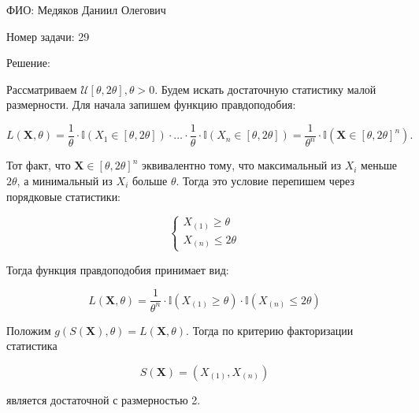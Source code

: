 \documentclass[14pt]{extarticle}
\begin{document}
ФИО: Медяков Даниил Олегович

\vspace{10pt}

Номер задачи: 29

\vspace{10pt}

Решение:

\vspace{10pt}

Рассматриваем $\mathcal{U}[\theta, 2\theta], \theta > 0$. Будем искать достаточную статистику малой размерности. Для начала запишем функцию правдоподобия:

\begin{equation*}
    L(\mathbf{X}, \theta) = \frac{1}{\theta}\cdot\mathbb I (X_1\in [\theta, 2\theta])\cdot\ldots\cdot\frac{1}{\theta}\cdot\mathbb I (X_n\in[\theta, 2\theta]) = \frac{1}{\theta^n}\cdot\mathbb I(\mathbf{X}\in[\theta, 2\theta]^n).
\end{equation*}

Тот факт, что $\mathbf{X}\in[\theta, 2\theta]^n$ эквивалентно тому, что максимальный из $X_i$ меньше $2\theta$, а минимальный из $X_i$ больше $\theta$. Тогда это условие перепишем через порядковые статистики:

\begin{equation*}
\begin{cases}
    X_{(1)} \geqslant \theta\\
    X_{(n)} \leqslant 2\theta
\end{cases}
\end{equation*}

Тогда функция правдоподобия принимает вид:

\begin{equation*}
    L(\mathbf{X}, \theta) = \frac{1}{\theta^n}\cdot \mathbb I(X_{(1)} \geqslant \theta)\cdot \mathbb I(X_{(n)} \leqslant 2\theta)
\end{equation*}

Положим $g(S(\mathbf{X}), \theta) = L(\mathbf{X}, \theta)$. Тогда по критерию факторизации статистика

\begin{equation*}
    S(\mathbf{X}) = \left(X_{(1)}, X_{(n)}\right)
\end{equation*}

является достаточной с размерностью 2.
\end{document}
